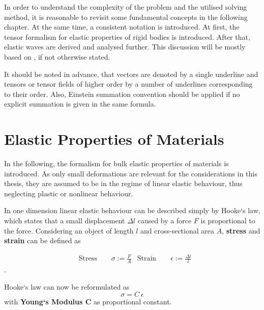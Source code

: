 In order to understand the complexity of the problem  and the
utilised solving method, it is reasonable to revisit some fundamental concepts
in the following chapter. At the same time, a consistent notation is
introduced. At first, the tensor formalism for elastic properties
of rigid bodies is introduced. After that, elastic waves are derived and
analysed further. This discussion will be mostly based on \cite{GrossMarx2014},
if not otherwise stated.

It should be noted in advance, that vectors are
denoted by a single underline and tensors or
tensor fields of higher order by a number of underlines corresponding to their
order. Also, Einstein summation convention should be applied if no explicit
summation is given in the same formula.

\section{Elastic Properties of Materials}
In the following, the formalism for bulk elastic properties of materials is
introduced. As only small deformations are relevant for the considerations in
this thesis, they are assumed to be in the regime of linear elastic behaviour,
thus neglecting plastic or nonlinear behaviour.

In one dimension linear elastic behaviour can be described simply
by Hooke`s law, which states that a small displacement $\Delta l$ caused by a
force $F$ is proportional to the force.
Considering an object of length $l$ and cross-sectional area $A$,
\textbf{stress} and \textbf{strain} can be defined as

\begin{align}
     & \text{Stress} \quad \quad \sigma := \frac{F}{A}
     & \text{Strain} \quad \quad \epsilon := \frac{\Delta l}{l}
\end{align}.

Hooke`s law can now be reformulated as
\begin{equation}
    \label{eq:HookStress1D}
    \sigma = C\ \epsilon
\end{equation}
with \textbf{Young`s Modulus C} as proportional constant.

